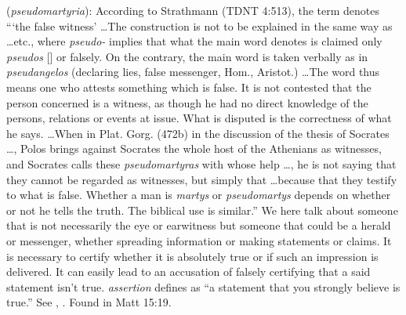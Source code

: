 \item[False assertion,]

(\textit{pseudomartyria}):
According to Strathmann (TDNT 4:513), the term denotes ```the false witness' \ldots The construction is not to be explained in the same way as \ldots etc., where \emph{pseudo-} implies that what the main word denotes is claimed only \emph{pseudos} [] or falsely.  On the contrary, the main word is taken verbally as in \emph{pseudangelos} (declaring lies, false messenger, Hom., Aristot.) \ldots The word thus means one who attests something which is false. It is not contested that the person concerned is a witness, as though he had no direct knowledge of the persons, relations or events at issue. What is disputed is the correctness of what he says. \ldots When in Plat. Gorg. (472b) in the discussion of the thesis of Socrates \ldots, Polos brings against Socrates the whole host of the Athenians as witnesses, and Socrates calls these \emph{pseudomartyras} with whose help \ldots, he is not saying that they cannot be regarded as witnesses, but simply that \ldots because that they testify to what is false. Whether a man is \emph{martys} or \emph{pseudomartys} depends on whether or not he tells the truth. The biblical use is similar.''
We here talk about someone that is not necessarily the eye or earwitness but someone that could be a herald or messenger, whether spreading information or making statements or claims. It is necessary to certify whether it is absolutely true or if such an impression is delivered. It can easily lead to an accusation of falsely certifying that a said statement isn't true. \emph{assertion} defines as ``a statement that you strongly believe is true.'' See , .
Found in Matt 15:19.
